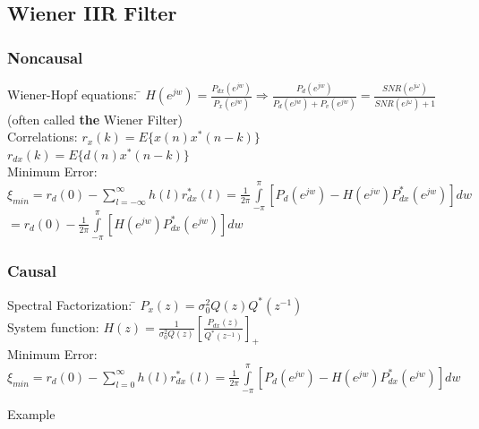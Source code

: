 \subsection{Wiener IIR Filter}
\begin{minipage}{8cm}
\subsubsection{Noncausal }
\begin{tabbing}
Wiener-Hopf equations: \=
$H(e^{jw})=\frac{P_{dx}(e^{jw})}{P_{x}(e^{jw})}  \Rightarrow
\frac{P_{d}(e^{jw})}{P_{d}(e^{jw}) + P_{v}(e^{jw})}= \frac{SNR(e^{j\omega})}{SNR(e^{j\omega}) + 1}$ (often called \textbf{the} Wiener Filter) \\

Correlations: \>
	$r_x(k) =E \{ x(n)x^{*}(n-k) \} $\\ 
	\>$r_{dx}(k) =E\{d(n)x^{*}(n-k)\}$\\


Minimum Error:\>
	$\xi_{min} =r_d(0)-\sum \limits_{l=-\infty}^\infty h(l)r_{dx}^{*}(l)
	=\frac{1}{2\pi}\int \limits_{-\pi}^\pi[P_d(e^{jw})-H(e^{jw})P_{dx}^{*}(e^{jw})]dw$\\
	\>$=r_d(0)-\frac{1}{2\pi}\int \limits_{-\pi}^\pi[H(e^{jw})P_{dx}^{*}(e^{jw})]dw$
\end{tabbing}

\end{minipage}

\subsubsection{Causal }
\begin{tabbing}
Spectral Factorization: \=
$ P_x(z) = \sigma_0^2 Q(z) Q^*(z^{-1}) $\\

System function:\hspace{1.2cm}\>
	$H(z)=\frac{1}{\sigma_0^2 Q(z) } [\frac{P_{dx}(z)}{Q^*(z^{-1})} ]_+ $ \\
	
Minimum Error:\>$\xi_{min} =r_d(0)-\sum \limits_{l=0}^\infty h(l)r_{dx}^{*}(l)
	=\frac{1}{2\pi}\int \limits_{-\pi}^\pi[P_d(e^{jw})-H(e^{jw})P_{dx}^{*}(e^{jw})]dw$\\
	
\end{tabbing}
Example 

